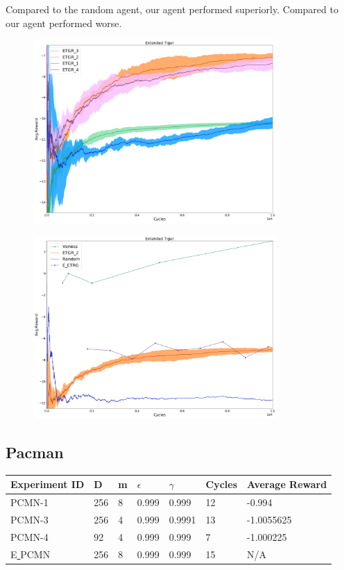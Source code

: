\documentclass{article}
\theoremstyle{definition}
\newtheorem{primary statistics}[definition]{Primary Statistics}
\newtheorem{auxiliary statistics}[definition]{Auxiliary Statistics}
\begin{document}
Compared to the random agent, our agent performed superiorly. Compared to \citep{veness2011monte} our agent performed worse.

 \begin{figure}[h]
 \centering
    \includegraphics[width=9.3cm]{4_Extended_Tiger}
\end{figure}

 \begin{figure}[h]
 \centering
    \includegraphics[width=9.3cm]{Extended_Tiger}
\end{figure}

\newpage

\subsection{Pacman}
 \begin{tabular}{|l|l|l|l|l|l|l|}
 \hline \centering
 Experiment ID& D & m & $\epsilon$ & $\gamma$ & Cycles & Average Reward \\ \hline
PCMN-1  & 256       & 8           & 0.999       & 0.999             & 12     & -0.994        \\ \hline
 PCMN-3    & 256       & 4           & 0.999       & 0.9991            & 13     & -1.0055625       \\ \hline
 PCMN-4     & 92        & 4           & 0.999       & 0.999             & 7      &    -1.000225    \\  \hline 
  E\underline{ }PCMN    & 256        & 8           & 0.999       & 0.999             & 15      &    N/A    \\  \hline     
\end{tabular}
\end{document}
